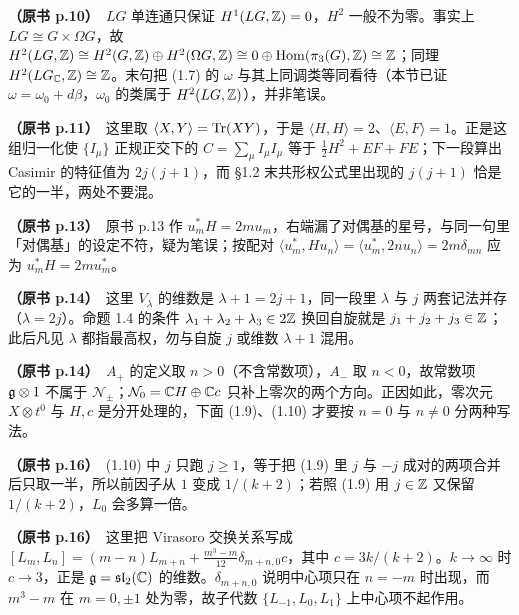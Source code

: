 \noindent \textbf{（原书 p.10）}\ $LG$ 单连通只保证 $H^{1}(LG,\mathbb{Z})=0$，$H^{2}$ 一般不为零。事实上 $LG\cong G\times\Omega G$，故 $H^{2}(LG,\mathbb{Z})\cong H^{2}(G,\mathbb{Z})\oplus H^{2}(\Omega G,\mathbb{Z})\cong 0\oplus\operatorname{Hom}(\pi_{3}(G),\mathbb{Z})\cong\mathbb{Z}$；同理 $H^{2}(LG_{\mathbb{C}},\mathbb{Z})\cong\mathbb{Z}$。末句把 (1.7) 的 $\omega$ 与其上同调类等同看待（本节已证 $\omega=\omega_{0}+d\beta$，$\omega_{0}$ 的类属于 $H^{2}(LG,\mathbb{Z})$），并非笔误。\par\smallskip

\noindent \textbf{（原书 p.11）}\ 这里取 $\langle X,Y\rangle=\operatorname{Tr}(XY)$，于是 $\langle H,H\rangle=2$、$\langle E,F\rangle=1$。正是这组归一化使 $\{I_\mu\}$ 正规正交下的 $C=\sum_\mu I_\mu I_\mu$ 等于 $\frac12H^2+EF+FE$；下一段算出 Casimir 的特征值为 $2j(j+1)$，而 §1.2 末共形权公式里出现的 $j(j+1)$ 恰是它的一半，两处不要混。\par\smallskip

\noindent \textbf{（原书 p.13）}\ 原书 p.13 作 $u_m^*H=2mu_m$，右端漏了对偶基的星号，与同一句里「对偶基」的设定不符，疑为笔误；按配对 $\langle u_m^*,Hu_n\rangle=\langle u_m^*,2nu_n\rangle=2m\delta_{mn}$ 应为 $u_m^*H=2mu_m^*$。\par\smallskip

\noindent \textbf{（原书 p.14）}\ 这里 $V_\lambda$ 的维数是 $\lambda+1=2j+1$，同一段里 $\lambda$ 与 $j$ 两套记法并存（$\lambda=2j$）。命题 1.4 的条件 $\lambda_1+\lambda_2+\lambda_3\in2\mathbb{Z}$ 换回自旋就是 $j_1+j_2+j_3\in\mathbb{Z}$；此后凡见 $\lambda$ 都指最高权，勿与自旋 $j$ 或维数 $\lambda+1$ 混用。\par\smallskip

\noindent \textbf{（原书 p.14）}\ $A_+$ 的定义取 $n>0$（不含常数项），$A_-$ 取 $n<0$，故常数项 $\mathfrak{g}\otimes1$ 不属于 $\mathcal{N}_\pm$；$\mathcal{N}_0=\mathbb{C} H\oplus\mathbb{C} c$ 只补上零次的两个方向。正因如此，零次元 $X\otimes t^0$ 与 $H,c$ 是分开处理的，下面 (1.9)、(1.10) 才要按 $n=0$ 与 $n\ne0$ 分两种写法。\par\smallskip

\noindent \textbf{（原书 p.16）}\ (1.10) 中 $j$ 只跑 $j\ge1$，等于把 (1.9) 里 $j$ 与 $-j$ 成对的两项合并后只取一半，所以前因子从 $1$ 变成 $1/(k+2)$；若照 (1.9) 用 $j\in\mathbb{Z}$ 又保留 $1/(k+2)$，$L_0$ 会多算一倍。\par\smallskip

\noindent \textbf{（原书 p.16）}\ 这里把 Virasoro 交换关系写成 $[L_m,L_n]=(m-n)L_{m+n}+\frac{m^3-m}{12}\delta_{m+n,0}c$，其中 $c=3k/(k+2)$。$k\to\infty$ 时 $c\to3$，正是 $\mathfrak{g}=\mathfrak{sl}_2(\mathbb{C})$ 的维数。$\delta_{m+n,0}$ 说明中心项只在 $n=-m$ 时出现，而 $m^3-m$ 在 $m=0,\pm1$ 处为零，故子代数 $\{L_{-1},L_0,L_1\}$ 上中心项不起作用。\par\smallskip

